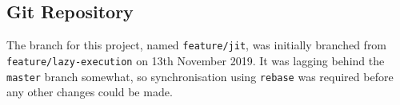 \subsection{Git Repository}
The branch for this project, named \verb|feature/jit|, was initially branched from \\\verb|feature/lazy-execution| on 13th November 2019. It was lagging behind the \verb|master| branch somewhat, so synchronisation using \verb|rebase| was required before any other changes could be made.
\par
%
%
%
%
%
%
%
%
%
%
